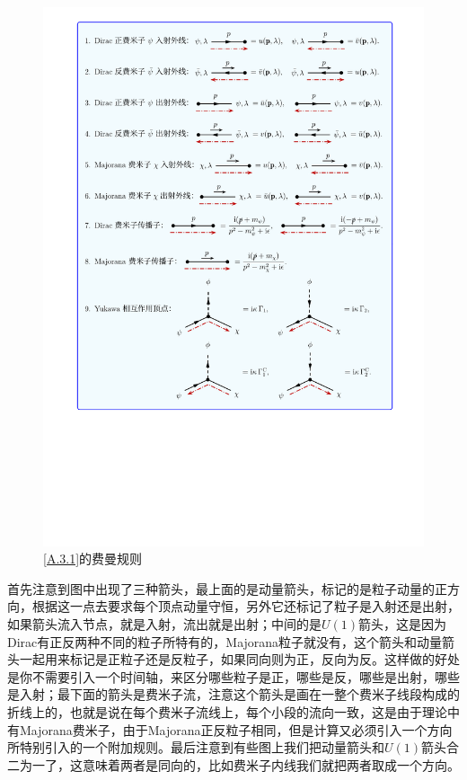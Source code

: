 \begin{figure}[htbp]
	\centering
	\includegraphics[width=\linewidth]{figs/fig19.pdf}
	\caption{\ref{A.3.1}的费曼规则}
	\label{fig.A.3.1}
\end{figure}

首先注意到图中出现了三种箭头，最上面的是动量箭头，标记的是粒子动量的正方向，根据这一点去要求每个顶点动量守恒，另外它还标记了粒子是入射还是出射，如果箭头流入节点，就是入射，流出就是出射；中间的是$U(1)$箭头，这是因为Dirac有正反两种不同的粒子所特有的，Majorana粒子就没有，这个箭头和动量箭头一起用来标记是正粒子还是反粒子，如果同向则为正，反向为反。这样做的好处是你不需要引入一个时间轴，来区分哪些粒子是正，哪些是反，哪些是出射，哪些是入射；最下面的箭头是费米子流，注意这个箭头是画在一整个费米子线段构成的折线上的，也就是说在每个费米子流线上，每个小段的流向一致，这是由于理论中有Majorana费米子，由于Majorana正反粒子相同，但是计算又必须引入一个方向所特别引入的一个附加规则。最后注意到有些图上我们把动量箭头和$U(1)$箭头合二为一了，这意味着两者是同向的，比如费米子内线我们就把两者取成一个方向。

